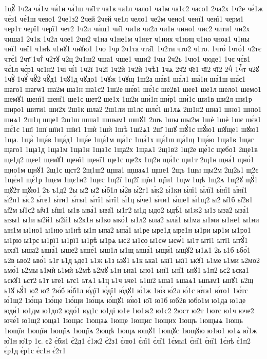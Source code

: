 {1цꙋ̑
1ч2а
ча́1м
ча́1н
ча́1ш
ча̑1т
ча1в
ча1л
чало1
ча1м
ча1с2
часо1
2ча2х
1ч2е
че́1ж
че́з1
че́1ш
чево1
2че1з2
2чей
2чей
че1л
чело1
че2м
чено1
ченї1
ченї1
черм1
чер1т
черї1
черї1
чет2
1ч2и
чи́щ1
чи̑1
чи1в
чи2л
чи1н
чино1
чис2
чити1
чи2х
чиша1
2ч1к
1ч2л
чле1
2чн2
ч1на
ч1не1м
ч1нет
ч1ник
ч1ниц
ч1но
чноа1
ч1ны
чнї1
чнї1
ч1нѣ
ч1нꙋ1
чнꙋю1
1чо
1чр
2ч1та
чта̑1
1ч2ти
что2
ч1то.
1что̀
1что́1
ч2тє
чтє́1
2чт҃
1чтⷭ
ч2тꙋ
ч2ц
2ч1ш2
чша1
чше1
чши2
1чы
2ч2ь
1чю1
чюде1
1чє
чє́в1
чє́1л
чє́р1
чє1н2
1чі
чі́1
1ч2ї
1ч2ї
1ч2ѝ
1ч2ѝ
1чѣ1
1чѧ
2ч҃2
ч҃е1
ч҃ї2
ч҃ї2
2чⷣ
1чⷭ҇т
ч2ꙋ
1чꙋ̀
1чꙋ́
чꙋ̑2
чꙋ̑д1
1чꙋ1д
чꙋдо1
1чꙋж
1чꙋщ
1ш2а
ша́в1
ша́л1
ша́1н
ша́1ш
ша́є1
шаго1
шагѡ1
ша2м
ша1н
ша1с2
1ш2е
ше́в1
ше́1с
ше2в1
шее1
ше1л
шело1
шемо1
шемꙋ1
шенї1
шенї1
ше1с
шет2
ше1х
1ш2и
ши́1п
ши́р1
ши́1с
ши1в
ши2л
ши1р
широ1
шити1
ши2х
2ш1к
шла2
2ш1ли
ш1лє
шлє́1
ш1лѧ
2ш1н2
шна1
шно1
шню1
шнѧ1
2ш1ц
шце1
2ш1ш
шша1
шшым1
шшꙋ1
2шъ
1шы
шы2м
1шѐ
1шѐ
1шє
шє́в1
шє́1с
1шї
1шї
шїи1
шїи1
1шѝ
1шѝ
1шѣ
1ш2ѧ1
2ш҃
1шꙋ
шꙋ́1с
шꙋ́ю1
шꙋще1
шꙋю1
1ща.
1ща̀
1ща́в
1ща́д1
1ща́е
1ща́1м
ща́1с
1ща́1х
ща́1ш
ща́1щ
1ща́ю
1ща1в
1щаг
щаго1
1ща1д
1ща1м
1ща1н
1ща1с
1ща2х
1щаѧ1
2щ1в2
1щ2е
ще́1с
щебо1
2ще1в
ще1д2
щее1
щемꙋ1
щенї1
щенї1
ще1с
ще2х
1щ2и
щи́1с
щи1т
2щ1н
щна́1
щно́1
щно1м
щнꙋ1
2щ1с
щст2
2щ1ш2
щша1
щшаѧ1
щше1
2щъ
1щы
щы2м
2щ2ь1
щ2є
1щє́н1
щє́1р
1щєм
1щє1н2
1щєс
1щ2ї
1щ2ї
щїи1
щїи1
1щѡ
1щѣ
1щ2ѧ
1щ2ꙋ
щꙋ́1
щꙋ2т
щꙋю1
2ъ
ъ1д2
2ы
ы2̀
ы2́
ы́б1л
ы́2в
ы́2г1
ы́к2
ы́1кн
ы́лї1
ы́лї1
ы́нї1
ы́нї1
ы́2п1
ы́с2
ы́те1
ы́ти1
ы́ты1
ы́тї1
ы́тї1
ы́1ц
ы́че1
ы́чи1
ы́ше1
ы́1щ2
ы2̑
ы̑1б
ы̑2в1
ы̑2м
ы̑1с2
ы̑ч1
ы̑ш1
ы1в
ыва́1
ыва̑1
ы1г2
ы1д
ыдо2
ыдѣ́1
ы1ж2
ы1з
ыза2
ыза́1
ызы1
ы1и
ы2й1
ы2й1
ы2к1н
ы1ко
ыко́1
ы1л2
ыла2
ыла́1
ы1ма
ы1ми
ы1не1
ы1ни
ын1м
ы1но1
ы1ню
ы1нѣ
ы1п
ыпа2
ыпа́1
ы1ре
ыре1д
ыре1н
ы1ри
ыр1м
ы1ро1
ы1рю
ы1рє
ы1рї1
ы1рї1
ы1рѣ
ы1рѧ
ыс2
ы1со
ы1сѡ
ысѡ́1
ы1т
ытї1
ытї1
ытꙋ́1
ыха̑1
ыша2
ыша́1
ыше2
ыше́1
ыш1л
ы1щ
ыща́1
ыщи́1
ыщꙋ2
ы1ѧ1
2ь
ь1б
ьбо́1
ь2в
ьво2
ьво́1
ь1г
ь1д
ьде1
ь1ж
ь1з
ьзꙋ1
ь1к
ька1
ькї1
ькї1
ькꙋ1
ь1ме
ь1ми
ь2мо2
ьмо́1
ь2мы
ь1мѝ
ь1мѝ
ь2мѣ
ь2мꙋ
ь1н
ьна1
ьно1
ьнї1
ьнї1
ьнꙋ1
ь1п2
ьс2
ьска1
ьскꙋ1
ьст2
ь1т
ьте1
ьтє1
ьтѧ1
ь1ц
ь1ч
ьче1
ь1ш2
ьша1
ьшаѧ1
ьшым1
ьшꙋ1
ь2щ
ь1ꙋ
ьꙋ́1
ю2̀
ю2́
2ю́б
ю́б1л
ю́дї1
ю́дї1
ю́дꙋ1
ю́1ж
1ю́з
ю́2л
ю́1с
ю́та1
ю́то1
1ю́тс
ю́1щ2
1ю́ща
1ю́ще
1ю́щи
1ю́щѧ
ю́щꙋ1
ю́ю1
ю̑1
ю1б
юб2в
юбо1м
ю1да
ю1де
юди́1
ю1дм
ю1до2
юдо́1
юд1с
ю1ді
ю1е
1ю1ж2
ю1с2
2юст
ю2т
1ютс
ю1ч
юче2
юче́1
ю1щ2
юща1
1ющас
1ющаѧ
1юще
1ющис
1ющих
1ющъ
1ющыѧ
1ющь
1ющїи
1ющїи
1ющїѧ
1ющїѧ
2ющѣ
1ющѧ
ющꙋ1
1ющꙋс
1ющꙋю
ю1ю1
ю1ѧ
ю҆́1ж
ю҆́1н
ю҆1р
1є.
є2́
є́би1
є́2д1
є́1ж2
є́2з1
є́лю1
є́лї1
є́лї1
1є́мы1
є́нї1
є́нї1
1є́нѣ
є́1п2
є́р1д
є́р1с
є́с1н
є́2т1
}
